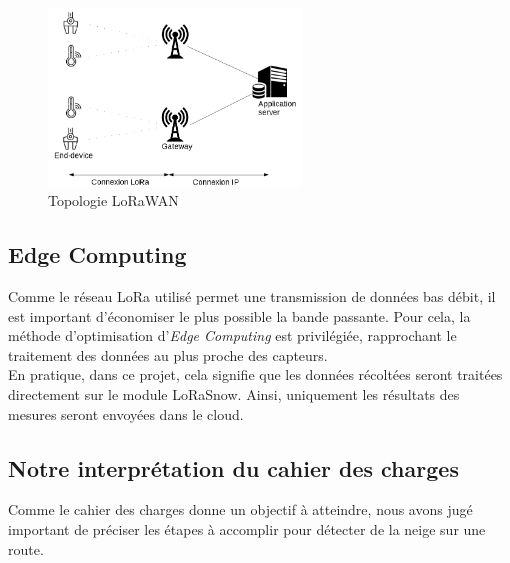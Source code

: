 \begin{figure}[H]
    \centering
    \includegraphics[width=0.6\textwidth]{Images/Illustration/Architecture_lorawan.png}
    \caption[]{Topologie LoRaWAN\footnotemark[1]}
    \label{LoRaWANTopo}
\end{figure}


\subsection{Edge Computing}

Comme le réseau LoRa utilisé permet une transmission de données bas débit, il est important d'économiser
le plus possible la bande passante. Pour cela, la méthode d'optimisation d'\emph{Edge Computing} est
privilégiée, rapprochant le traitement des données au plus proche des capteurs.\\
En pratique, dans ce projet, cela signifie que les données récoltées seront traitées directement sur 
le module LoRaSnow. Ainsi, uniquement les résultats des mesures seront envoyées dans le cloud.

\subsection{Notre interprétation du cahier des charges}
Comme le cahier des charges donne un objectif à atteindre, nous avons jugé important de préciser les 
étapes à accomplir pour détecter de la neige sur une route.

